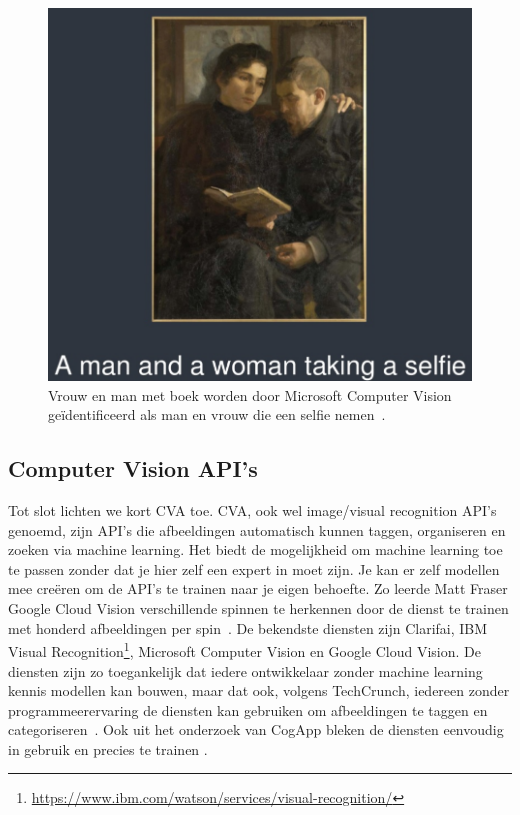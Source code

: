 \documentclass[fleqn,10pt]{voorstel}
\begin{document}
\begin{itemize}
	\begin{figure}[h]
		\caption{Vrouw en man met boek worden door Microsoft Computer Vision ge\"identificeerd als man en vrouw die een selfie nemen~\autocite{Roddis2018}.}
		\centering
		\includegraphics[width=\linewidth]{pictures/roddis_grappig_2}
	\end{figure}

\end{itemize}

\subsection{Computer Vision API's}
Tot slot lichten we kort CVA toe. CVA, ook wel image/visual recognition API's genoemd, zijn API's die afbeeldingen automatisch kunnen taggen, organiseren en zoeken via machine learning. Het biedt de mogelijkheid om machine learning toe te passen zonder dat je hier zelf een expert in moet zijn. Je kan er zelf modellen mee creëren om de API's te trainen naar je eigen behoefte. Zo leerde Matt Fraser Google Cloud Vision verschillende spinnen te herkennen door de dienst te trainen met honderd afbeeldingen per spin~\autocite{Fraser2018}.  De bekendste diensten zijn Clarifai, IBM Visual Recognition\footnote{\url{https://www.ibm.com/watson/services/visual-recognition/}}, Microsoft Computer Vision en Google Cloud Vision.  De diensten zijn zo toegankelijk dat iedere ontwikkelaar zonder machine learning kennis modellen kan bouwen, maar dat ook, volgens TechCrunch, iedereen zonder programmeerervaring de diensten kan gebruiken om afbeeldingen te taggen en categoriseren~\autocite{Lardinois2018}. Ook uit het onderzoek van CogApp bleken de diensten eenvoudig in gebruik en precies te trainen \autocite{Hindle2017}.
\end{document}
